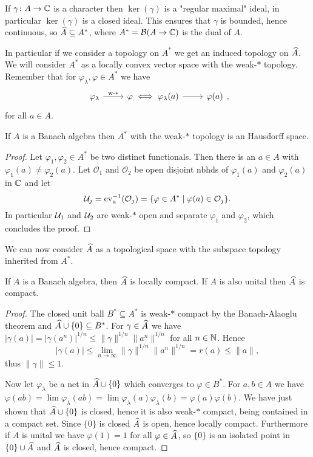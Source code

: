 \begin{fact}
 If $\gamma\colon A\to\mathbb{C}$ is a character then $\ker(\gamma)$ is a "regular maximal" ideal, in particular $\ker(\gamma)$ is a closed ideal. This ensures that $\gamma$ is bounded, hence continuous, so $\widehat{A}\subseteq A^\ast$, where $A^\ast=\mathcal{B}(A\to\mathbb{C})$ is the dual of $A$.
 
 \noindent In particular if we consider a topology on $A^\ast$ we get an induced topology on $\widehat{A}$. We will consider $A^\ast$ as a locally convex vector space with the weak-$\ast$ topology. Remember that for $\varphi_\lambda,\varphi\in A^\ast$ we have $$\begin{tikzcd}\varphi_\lambda\arrow["\text{w-}\ast",r] & \varphi\iff\varphi_\lambda(a)\arrow[r] &\varphi(a)\end{tikzcd},$$ for all $a\in A$.
\end{fact}

\begin{lemma}
 If $A$ is a Banach algebra then $A^\ast$ with the weak-$\ast$ topology is an Hausdorff space.
\end{lemma}
\begin{proof}
 Let $\varphi_1,\varphi_2\in A^\ast$ be two distinct functionals. Then there is an $a\in A$ with $\varphi_1(a)\neq\varphi_2(a)$. Let $\mathcal O_1$ and $\mathcal O_2$ be open disjoint nbhds of $\varphi_1(a)$ and $\varphi_2(a)$ in $\mathbb{C}$ and let $$\mathcal{U}_j=\mathrm{ev}_a^{-1}(\mathcal O_j)=\{\varphi\in A^\ast\mid\varphi(a)\in\mathcal O_j\}.$$
 In particular $\mathcal{U}_1$ and $\mathcal{U}_2$ are weak-$\ast$ open and separate $\varphi_1$ and $\varphi_2$, which concludes the proof.
\end{proof}

\noindent We can now consider $\widehat{A}$ as a topological space with the subspace topology inherited from $A^\ast$.

\begin{proposition}
 If $A$ is a Banach algebra, then $\widehat{A}$ is locally compact. If $A$ is also unital then $\widehat{A}$ is compact.
\end{proposition}
\begin{proof}
 The closed unit ball $B^\ast\subseteq A^\ast$ is weak-$\ast$ compact by the Banach-Alaoglu theorem and $\widehat{A}\cup\{0\}\subseteq B^\ast$. For $\gamma\in\widehat{A}$ we have $|\gamma(a)|=|\gamma(a^n)|^{1/n}\leq\|\gamma\|^{1/n}\|a^n\|^{1/n}$ for all $n\in\mathbb{N}$. Hence $$|\gamma(a)|\leq\lim_{n\to\infty}\|\gamma\|^{1/n}\|a^n\|^{1/n}=r(a)\leq\|a\|,$$ thus $\|\gamma\|\leq 1$.
 
 \noindent Now let $\varphi_\lambda$ be a net in $\widehat{A}\cup\{0\}$ which converges to $\varphi\in B^\ast$. For $a,b\in A$ we have $\varphi(ab)=\lim\varphi_\lambda(ab)=\lim\varphi_\lambda(a)\varphi_\lambda(b)=\varphi(a)\varphi(b)$. We have just shown that $\widehat{A}\cup\{0\}$ is closed, hence it is also weak-$\ast$ compact, being contained in a compact set. Since $\{0\}$ is closed $\widehat{A}$ is open, hence locally compact. Furthermore if $A$ is unital we have $\varphi(1)=1$ for all $\varphi\in\widehat{A}$, so $\{0\}$ is an isolated point in $\{0\}\cup\widehat{A}$ and $\widehat{A}$ is closed, hence compact.
\end{proof}
